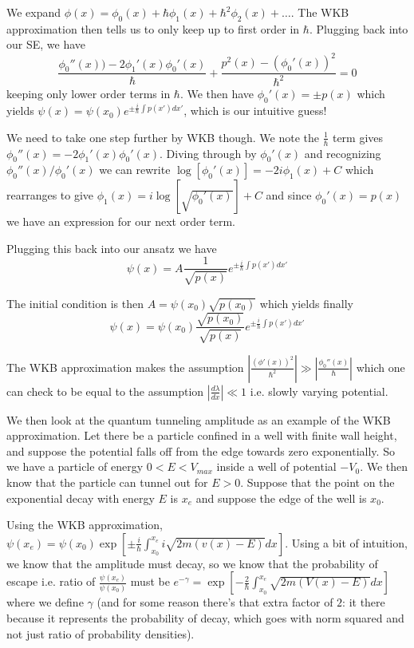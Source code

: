\documentclass[10pt]{report}
\newcommand{\rd}[2]{\frac{d#1}{d#2}}
\newcommand{\abs}[1]{\left|#1\right|}
\begin{document}
We expand $\phi(x) = \phi_0(x) + \hbar\phi_1(x) + \hbar^2 \phi_2(x) +\dots$. The WKB approximation then tells us to only keep up to first order in $\hbar$. Plugging back into our SE, we have
$$\frac{\phi_0''(x)) - 2\phi_1'(x) \phi_0'(x)}{\hbar} + \frac{p^2(x) - (\phi_0'(x))^2}{\hbar^2} = 0$$
keeping only lower order terms in $\hbar$. We then have $\phi_0'(x) = \pm p(x)$ which yields $\psi(x) = \psi(x_0) e^{\pm \frac{i}{\hbar}\int p(x') dx'}$, which is our intuitive guess!

We need to take one step further by WKB though. We note the $\frac{1}{\hbar}$ term gives $\phi_0''(x) = -2\phi_1'(x) \phi_0'(x)$. Diving through by $\phi_0'(x)$ and recognizing $\phi_0''(x) / \phi_0'(x)$ we can rewrite $\log[\phi_0'(x)] = -2i\phi_1(x) + C$ which rearranges to give $\phi_1(x) = i\log[\sqrt{\phi_0'(x)}] + C$ and since $\phi_0'(x) = p(x)$ we have an expression for our next order term.

Plugging this back into our ansatz we have
$$\psi(x) = A\frac{1}{\sqrt{p(x)}} e^{\pm \frac{i}{\hbar}\int p(x') dx'}$$

The initial condition is then $A = \psi(x_0) \sqrt{p(x_0)}$ which yields finally
$$\psi(x) = \psi(x_0)\frac{\sqrt{p(x_0)}}{\sqrt{p(x)}} e^{\pm \frac{i}{\hbar}\int p(x') dx'}$$

The WKB approximation makes the assumption $\abs{\frac{(\phi'(x))^2}{\hbar^2}} \gg \abs{\frac{\phi_0''(x)}{\hbar}}$ which one can check to be equal to the assumption $\abs{\rd{\lambda}{x}} \ll 1$ i.e. slowly varying potential.

We then look at the quantum tunneling amplitude as an example of the WKB approximation. Let there be a particle confined in a well with finite wall height, and suppose the potential falls off from the edge towards zero exponentially. So we have a particle of energy $0 < E < V_{max}$ inside a well of potential $-V_0$. We then know that the particle can tunnel out for $E > 0$. Suppose that the point on the exponential decay with energy $E$ is $x_e$ and suppose the edge of the well is $x_0$.

Using the WKB approximation, $\psi(x_e) = \psi(x_0) \exp\left[\pm \frac{i}{\hbar}\int_{x_0}^{x_e}i\sqrt{2m(v(x) - E)}dx\right]$. Using a bit of intuition, we know that the amplitude must decay, so we know that the probability of escape i.e. ratio of $\frac{\psi(x_e)}{\psi(x_0)}$ must be  $e^{-\gamma} = \exp\left[-\frac{2}{\hbar}\int_{x_0}^{x_e}\sqrt{2m(V(x) - E)}dx\right]$ where we define $\gamma$ (and for some reason there's that extra factor of $2$: it there because it represents the probability of decay, which goes with norm squared and not just ratio of probability densities).
\end{document}
